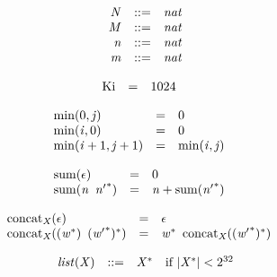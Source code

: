 \vspace{1ex}

$$
\begin{array}{@{}lrrl@{}l@{}}
& {\mathit{N}} &::=& {\mathit{nat}} \\
& {\mathit{M}} &::=& {\mathit{nat}} \\
& {\mathit{n}} &::=& {\mathit{nat}} \\
& {\mathit{m}} &::=& {\mathit{nat}} \\
\end{array}
$$

\vspace{1ex}

$$
\begin{array}{@{}lcl@{}l@{}}
{\mathrm{Ki}} &=& 1024 &  \\
\end{array}
$$

\vspace{1ex}

$$
\begin{array}{@{}lcl@{}l@{}}
{\mathrm{min}}(0, {\mathit{j}}) &=& 0 &  \\
{\mathrm{min}}({\mathit{i}}, 0) &=& 0 &  \\
{\mathrm{min}}({\mathit{i}} + 1, {\mathit{j}} + 1) &=& {\mathrm{min}}({\mathit{i}}, {\mathit{j}}) &  \\
\end{array}
$$

$$
\begin{array}{@{}lcl@{}l@{}}
{\mathrm{sum}}(\epsilon) &=& 0 &  \\
{\mathrm{sum}}({\mathit{n}}~\,{{\mathit{n}'}^\ast}) &=& {\mathit{n}} + {\mathrm{sum}}({{\mathit{n}'}^\ast}) &  \\
\end{array}
$$

\vspace{1ex}

$$
\begin{array}{@{}lcl@{}l@{}}
{{\mathrm{concat}}}_{{\mathit{X}}}(\epsilon) &=& \epsilon &  \\
{{\mathrm{concat}}}_{{\mathit{X}}}(({{\mathit{w}}^\ast})~\,{({{\mathit{w}'}^\ast})^\ast}) &=& {{\mathit{w}}^\ast}~\,{{\mathrm{concat}}}_{{\mathit{X}}}({({{\mathit{w}'}^\ast})^\ast}) &  \\
\end{array}
$$

$$
\begin{array}{@{}lrrl@{}l@{}}
& {\mathit{list}}({\mathit{X}}) &::=& {{\mathit{X}}^\ast} &\quad
  \mbox{if}~{|{{\mathit{X}}^\ast}|} < {2^{32}} \\
\end{array}
$$

